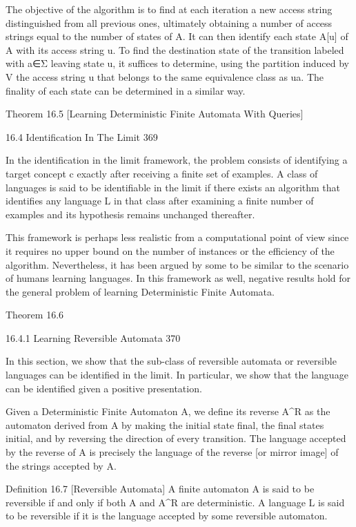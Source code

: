 The objective of the algorithm is to find at each iteration a new access string distinguished from all previous ones, ultimately obtaining a number of access strings equal to the number of states of A. It can then identify each state A[u] of A with its access string u. To find the destination state of the transition labeled with a∈Σ leaving state u, it suffices to determine, using the partition induced by V the access string u that belongs to the same equivalence class as ua. The finality of each state can be determined in a similar way.

Theorem 16.5 [Learning Deterministic Finite Automata With Queries]

16.4 Identification In The Limit 369

In the identification in the limit framework, the problem consists of identifying a target concept c exactly after receiving a finite set of examples. A class of languages is said to be identifiable in the limit if there exists an algorithm that identifies any language L in that class after examining a finite number of examples and its hypothesis remains unchanged thereafter.

This framework is perhaps less realistic from a computational point of view since it requires no upper bound on the number of instances or the efficiency of the algorithm. Nevertheless, it has been argued by some to be similar to the scenario of humans learning languages. In this framework as well, negative results hold for the general problem of learning Deterministic Finite Automata.

Theorem 16.6

16.4.1 Learning Reversible Automata 370

In this section, we show that the sub-class of reversible automata or reversible languages can be identified in the limit. In particular, we show that the language can be identified given a positive presentation.

Given a Deterministic Finite Automaton A, we define its reverse A^R as the automaton derived from A by making the initial state final, the final states initial, and by reversing the direction of every transition. The language accepted by the reverse of A is precisely the language of the reverse [or mirror image] of the strings accepted by A.

Definition 16.7 [Reversible Automata] A finite automaton A is said to be reversible if and only if both A and A^R are deterministic. A language L is said to be reversible if it is the language accepted by some reversible automaton.

